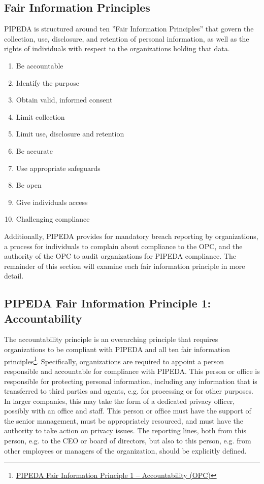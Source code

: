 \subsection*{Fair Information Principles}

PIPEDA is structured around ten ''Fair Information Principles'' that govern the collection, use, disclosure, and retention of personal information, as well as the rights of individuals with respect to the organizations holding that data. 

\begin{enumerate}
   \item Be accountable
   \item Identify the purpose
   \item Obtain valid, informed consent
   \item Limit collection
   \item Limit use, disclosure and retention
   \item Be accurate
   \item Use appropriate safeguards
   \item Be open
   \item Give individuals access
   \item Challenging compliance
\end{enumerate}

Additionally, PIPEDA provides for mandatory breach reporting by organizations, a process for individuals to complain about compliance to the OPC, and the authority of the OPC to audit organizations for PIPEDA compliance. The remainder of this section will examine each fair information principle in more detail.

\subsection*{PIPEDA Fair Information Principle 1: Accountability}

The accountability principle is an overarching principle that requires organizations to be compliant with PIPEDA and all ten fair information principles\footnote{\href{https://www.priv.gc.ca/en/privacy-topics/privacy-laws-in-canada/the-personal-information-protection-and-electronic-documents-act-pipeda/p_principle/principles/p_accountability/}{PIPEDA Fair Information Principle 1 -- Accountability (OPC)}}. Specifically, organizations are required to appoint a person responsible and accountable for compliance with PIPEDA. This person or office is responsible for protecting personal information, including any information that is transferred to third parties and agents, e.g. for processing or for other purposes. In larger companies, this may take the form of a dedicated privacy officer, possibly with an office and staff. This person or office must have the support of the senior management, must be appropriately resourced, and must have the authority to take action on privacy issues. The reporting lines, both from this person, e.g. to the CEO or board of directors, but also to this person, e.g. from other employees or managers of the organization, should be explicitly defined. 

